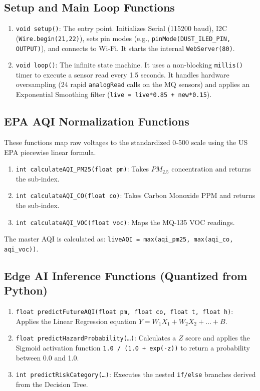 \documentclass[11pt,a4paper]{article}
\begin{document}
\subsection{Setup and Main Loop Functions}
\begin{enumerate}
    \item \texttt{void setup()}: The entry point. Initializes Serial (115200 baud), I2C (\texttt{Wire.begin(21,22)}), sets pin modes (e.g., \texttt{pinMode(DUST\_ILED\_PIN, OUTPUT)}), and connects to Wi-Fi. It starts the internal \texttt{WebServer(80)}.
    \item \texttt{void loop()}: The infinite state machine. It uses a non-blocking \texttt{millis()} timer to execute a sensor read every 1.5 seconds. It handles hardware oversampling (24 rapid \texttt{analogRead} calls on the MQ sensors) and applies an Exponential Smoothing filter (\texttt{live = live*0.85 + new*0.15}).
\end{enumerate}

\subsection{EPA AQI Normalization Functions}
These functions map raw voltages to the standardized 0-500 scale using the US EPA piecewise linear formula.
\begin{enumerate}
    \item \texttt{int calculateAQI\_PM25(float pm)}: Takes $PM_{2.5}$ concentration and returns the sub-index.
    \item \texttt{int calculateAQI\_CO(float co)}: Takes Carbon Monoxide PPM and returns the sub-index.
    \item \texttt{int calculateAQI\_VOC(float voc)}: Maps the MQ-135 VOC readings.
\end{enumerate}
The master AQI is calculated as: \texttt{liveAQI = max(aqi\_pm25, max(aqi\_co, aqi\_voc))}.

\subsection{Edge AI Inference Functions (Quantized from Python)}
\begin{enumerate}
    \item \texttt{float predictFutureAQI(float pm, float co, float t, float h)}: Applies the Linear Regression equation $Y = W_1X_1 + W_2X_2 + \dots + B$.
    \item \texttt{float predictHazardProbability(\dots)}: Calculates a $Z$ score and applies the Sigmoid activation function \texttt{1.0 / (1.0 + exp(-z))} to return a probability between 0.0 and 1.0.
    \item \texttt{int predictRiskCategory(\dots)}: Executes the nested \texttt{if/else} branches derived from the Decision Tree.
\end{enumerate}
\end{document}
